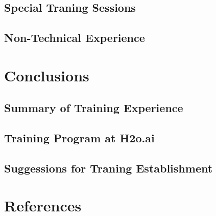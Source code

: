 \documentclass[12pt,a4paper]{report}
\begin{document}
\section{Special Traning Sessions}

\section{Non-Technical Experience}

\chapter{Conclusions}

\section{Summary of Training Experience}

\section{Training Program at H2o.ai}

\section{Suggessions for Traning Establishment}

\chapter{References}
\end{document}
